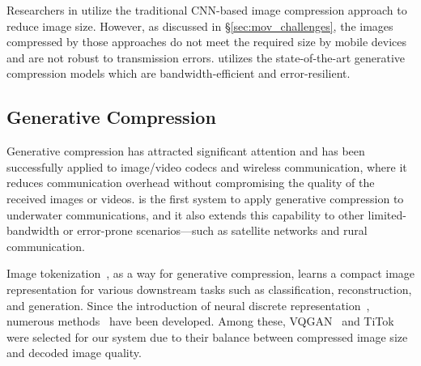 Researchers in \cite{anjum2022deep,anjum2022acoustic} utilize the traditional CNN-based image compression approach to reduce image size. However, as discussed in \S\ref{sec:mov_challenges}, the images compressed by those approaches do not meet the required size by mobile devices and are not robust to transmission errors. \sysname utilizes the state-of-the-art generative compression models which are bandwidth-efficient and error-resilient.










\subsection{Generative Compression}
Generative compression has attracted significant attention \cite{grassucci2023generative,xie2021tsp,dai2023wc,anjum2022deep,le2023arxiv,li2024reparolossresilientgenerativecodec,NEURIPS2019_f1ea154c} and has been successfully applied to image/video codecs and wireless communication, where it reduces communication overhead without compromising the quality of the received images or videos.
\sysname is the first system to apply generative compression to underwater communications, and it also extends this capability to other limited-bandwidth or error-prone scenarios---such as satellite networks and rural communication.

Image tokenization~\cite{yan2024elastictokadaptivetokenizationimage,shen2025catcontentadaptiveimagetokenization}, as a way for generative compression, learns a compact image representation for various downstream tasks such as classification, reconstruction, and generation.
Since the introduction of neural discrete representation~\cite{van2017neural}, numerous methods~\cite{esser2020taming, yu2024image, yu2023language, yu2021vector} have been developed. Among these, VQGAN~\cite{esser2020taming} and TiTok~\cite{yu2024image} were selected for our system due to their balance between compressed image size and decoded image quality.